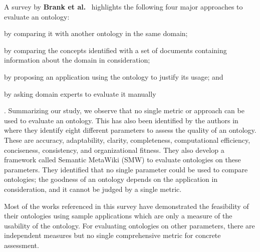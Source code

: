 \documentclass{elsart}  %
\begin{document}
\par
A survey by \textbf{Brank et al.}~\cite{brank2005survey} highlights the following four major approaches to evaluate an ontology: \begin{inparaenum} \item by comparing it with another ontology in the same domain; \item by comparing the concepts identified with a set of documents containing information about the domain in consideration; \item by proposing an application using the ontology to justify its usage; and \item by asking domain experts to evaluate it manually\end{inparaenum}. Summarizing our study, we observe that no single metric or approach can be used to evaluate an ontology. This has also been identified by the authors in~\cite{vrandevcic2009ontology} where they identify eight different parameters to assess the quality of an ontology. These are accuracy, adaptability, clarity, completeness, computational efficiency, conciseness, consistency, and organizational fitness. They also develop a framework called Semantic MetaWiki (SMW) to evaluate ontologies on these parameters. They identified that no single parameter could be used to compare ontologies; the goodness of an ontology depends on the application in consideration, and it cannot be judged by a single metric. 

Most of the works referenced in this survey have demonstrated the feasibility of their ontologies using sample applications which are only a measure of the usability of the ontology. For evaluating ontologies on other parameters, there are independent measures but no single comprehensive metric for concrete assessment. 
\end{document}
